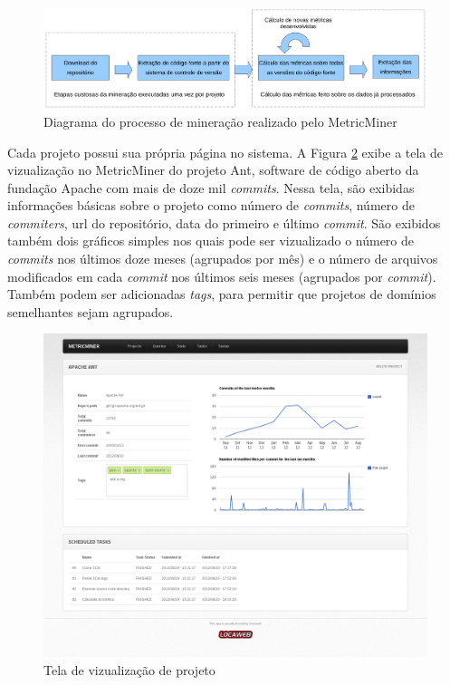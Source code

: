 \documentclass[a4paper, 12pt, twoside]{book}
\begin{document}
        \begin{figure}[ht]
            \centering
            \includegraphics[width=1.0\textwidth]{img/diagrama.png}
            \caption{Diagrama do processo de mineração realizado pelo MetricMiner}
            \label{fig:diagrama}
        \end{figure}

        Cada projeto possui sua própria página no sistema. A Figura \ref{fig:screen_projeto} exibe a 
        tela de vizualização no MetricMiner do projeto Ant, software de código aberto da fundação     
        Apache com mais de doze mil \textit{commits}. Nessa tela, são exibidas informações básicas 
        sobre o projeto como número de \textit{commits}, número de \textit{commiters}, url do 
        repositório, data do primeiro e último \textit{commit}. São exibidos também dois gráficos 
        simples nos quais pode ser vizualizado o número de \textit{commits} nos últimos doze meses 
        (agrupados por mês) e o número de arquivos modificados em cada \textit{commit} nos últimos 
        seis meses (agrupados por \textit{commit}). Também podem ser adicionadas \textit{tags},
        para permitir que projetos de domínios semelhantes sejam agrupados.
    
        \begin{figure}[ht]
            \centering
            \includegraphics[width=1.00\textwidth]{img/ant.png}
            \caption{Tela de vizualização de projeto}
            \label{fig:screen_projeto}
        \end{figure}
\end{document}
